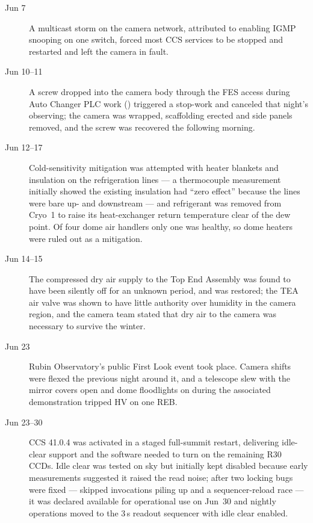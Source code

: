 \begin{description}
\item[Jun 7] A multicast storm on the camera network, attributed to
  enabling IGMP snooping on one switch, forced most CCS services to be
  stopped and restarted and left the camera in fault.

\item[Jun 10--11] A screw dropped into the camera body through the FES
  access during Auto Changer PLC work () triggered a
  stop-work and canceled that night's observing; the camera was
  wrapped, scaffolding erected and side panels removed, and the screw
  was recovered the following morning.

\item[Jun 12--17] Cold-sensitivity mitigation was attempted with
  heater blankets and insulation on the refrigeration lines --- a
  thermocouple measurement initially showed the existing insulation
  had ``zero effect'' because the lines were bare up- and downstream
  --- and refrigerant was removed from Cryo~1 to raise its
  heat-exchanger return temperature clear of the dew point.  Of four dome air
  handlers only one was healthy, so dome heaters were ruled out as a
  mitigation.

\item[Jun 14--15] The compressed dry air supply to the Top End
  Assembly was found to have been silently off for an unknown period,
  and was restored; the TEA air valve was shown to have little
  authority over humidity in the camera region, and the camera team
  stated that dry air to the camera was necessary to survive the
  winter.

\item[Jun 23] Rubin Observatory's public First Look event took place.
  Camera shifts were flexed the previous night around it, and a
  telescope slew with the mirror covers open and dome floodlights on
  during the associated demonstration tripped HV on one REB.

\item[Jun 23--30] CCS 41.0.4 was activated in a staged full-summit
  restart, delivering idle-clear support and the software needed to
  turn on the remaining R30 CCDs.  Idle clear was tested on sky but
  initially kept disabled because early measurements suggested it
  raised the read noise; after two locking bugs were fixed --- skipped
  invocations piling up and a sequencer-reload race --- it was
  declared available for operational use on Jun~30 and nightly
  operations moved to the 3\,s readout sequencer with idle clear
  enabled.


\end{description}
